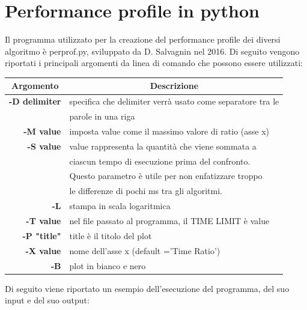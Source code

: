 \chapter{Performance profile in python}\label{perf_profile_py}
Il programma utilizzato per la creazione del performance profile dei diversi algoritmo è perprof.py, sviluppato da D. Salvagnin nel 2016. Di seguito vengono riportati i principali argomenti da linea di comando che possono essere utilizzati:
\begin{table}[h]
\centering
\begin{tabular}{rl}
\hline
\multicolumn{1}{c}{\textbf{Argomento}} & \multicolumn{1}{c}{\textbf{Descrizione}}\\
\hline
\textbf{-D delimiter} & {specifica che delimiter verrà usato come separatore tra le}\\
& {parole in una riga}\\
\textbf{-M value} & {imposta value come il massimo valore di ratio (asse x)}\\
\textbf{-S value} & {value rappresenta la quantità che viene sommata a}\\
& {ciascun tempo di esecuzione prima del confronto.}\\
& {Questo parametro è utile per non enfatizzare troppo}\\
& {le differenze di pochi ms tra gli algoritmi.}\\
\textbf{-L} & {stampa in scala logaritmica}\\
\textbf{-T value} & {nel file passato al programma, il TIME LIMIT è value}\\
\textbf{-P "title"} & {title è il titolo del plot}\\
\textbf{-X value} & {nome dell'asse x (default ='Time Ratio')}\\
\textbf{-B} & {plot in bianco e nero}\\
\hline
\end{tabular}
\end{table}
Di seguito viene riportato un esempio dell'esecuzione del programma, del suo input e del suo output:
